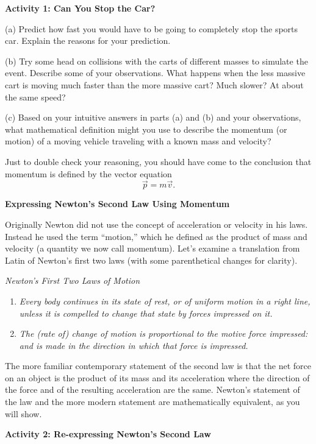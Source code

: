 \textbf{Activity 1: Can You Stop the Car?} 

(a) Predict how fast you would have to be going to completely stop the sports
car. Explain the reasons for your prediction.
\vspace{20mm}

(b) Try some head on collisions with the carts of different masses to simulate
the event. Describe some of your observations. What happens when the less massive
cart is moving much faster than the more massive cart? Much slower? At about
the same speed?
\vspace{20mm}

(c) Based on your intuitive answers in parts (a) and (b) and your observations,
what mathematical definition might you use to describe the momentum (or motion)
of a moving vehicle traveling with a known mass and velocity?
\vspace{20mm}

Just to double check your reasoning, you should have come to the conclusion
that momentum is defined by the vector equation
\[
{\vec p}=m{\vec v}.\]


\textbf{Expressing Newton's Second Law Using Momentum }

Originally Newton did not use the concept of acceleration or velocity in his
laws. Instead he used the term ``motion,'' which he defined
as the product of mass and velocity (a quantity we now call momentum). Let's
examine a translation from Latin of Newton's first two laws (with some parenthetical
changes for clarity).

\textit{Newton's First Two Laws of Motion}

\begin{enumerate}
\item \textit{Every body continues in its state of rest, or of uniform motion in a
right line, unless it is compelled to change that state by forces impressed
on it. }
\item \textit{The (rate of) change of motion is proportional to the motive force impressed:
and is made in the direction in which that force is impressed.}
\end{enumerate}
The more familiar contemporary statement of the second law is that the net force
on an object is the product of its mass and its acceleration where the direction
of the force and of the resulting acceleration are the same. Newton's statement
of the law and the more modern statement are mathematically equivalent, as you
will show.

\textbf{Activity 2: Re-expressing Newton's Second Law} 

